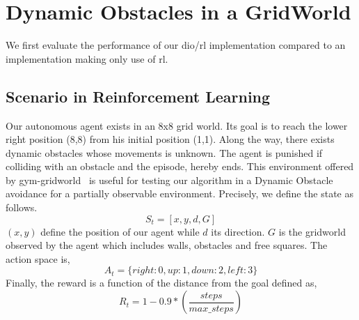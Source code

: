 \section{Dynamic Obstacles in a GridWorld} 
We first evaluate the performance of our dio/rl implementation compared to an implementation making only use of rl. 

\subsection{Scenario in Reinforcement Learning}

Our autonomous agent exists in an 8x8 grid world. Its goal is to reach
the lower right position (8,8) from his initial position (1,1).
Along the way, there exists dynamic obstacles whose movements is
unknown. The agent is punished if colliding with an obstacle and the
episode, hereby ends. 
This environment offered by gym-gridworld~\cite{gym_minigrid} is useful for testing our algorithm in a Dynamic Obstacle avoidance for a partially observable 
environment. Precisely, we define the state as follows. 
\begin{equation*}
  S_t = [x, y, d, G]
\end{equation*}
$(x,y)$ define the position of our agent while $d$ its direction. $G$
is the gridworld observed by the agent which includes walls, obstacles
and free squares. 
The action space is, 
\begin{equation*}
  A_t = \{ right: 0, up: 1, down: 2, left: 3 \}
\end{equation*}
Finally, the reward is a function of the distance from the goal
defined as, 
\begin{equation*}
  R_t = 1 - 0.9*(\dfrac{steps}{max\_steps})
\end{equation*}

